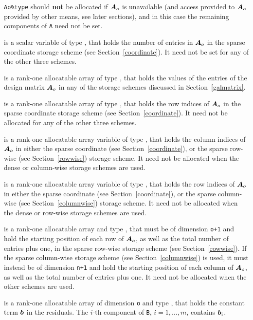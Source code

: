 \documentclass{galahad}
\begin{document}
\begin{description}
\begin{description}
\noindent
{\tt Ao\%type} should {\bf not} be allocated if ${\bm{A}}_o$ is unavailable
(and access provided to  ${\bm{A}}_o$ provided by other means, see later sections), 
and in this case the remaining components of {\tt A} need not be set.

 is a scalar variable of type \integer, that
holds the number of entries in ${\bm{A}}_o$
in the sparse coordinate storage scheme (see Section~\ref{coordinate}).
It need not be set for any of the other three schemes.

 is a rank-one allocatable array of type \realdp, that 
holds the values of the entries of the design matrix ${\bm{A}}_o$ in any of the
storage schemes discussed in Section~\ref{galmatrix}.

 is a rank-one allocatable array of type \integer,
that holds the row indices of ${\bm{A}}_o$ in the sparse coordinate storage
scheme (see Section~\ref{coordinate}).
It need not be allocated for any of the other three schemes.

 is a rank-one allocatable array variable of type \integer,
that holds the column indices of ${\bm{A}}_o$ in either the sparse coordinate
(see Section~\ref{coordinate}), or the sparse row-wise
(see Section~\ref{rowwise}) storage scheme.
It need not be allocated when the dense or column-wise storage schemes are used.

 is a rank-one allocatable array variable of type \integer,
that holds the row indices of ${\bm{A}}_o$ in either the sparse coordinate
(see Section~\ref{coordinate}), or the sparse column-wise
(see Section~\ref{columnwise}) storage scheme.
It need not be allocated when the dense or row-wise storage schemes are used.

 is a rank-one allocatable array and type \integer,
that must be of dimension {\tt o+1}
and hold the starting position of each row of ${\bm{A}}_o$, as well
as the total number of entries plus one, in the sparse row-wise storage
scheme (see Section~\ref{rowwise}).
If the sparse column-wise storage scheme (see Section~\ref{columnwise})
is used, it must instead be of dimension {\tt n+1}
and hold the starting position of each column of ${\bm{A}}_o$, as well
as the total number of entries plus one.
It need not be allocated when the
other schemes are used.

\end{description}

 is a rank-one allocatable array of dimension {\tt o} and type
\realdp, that holds the constant term ${\bm{b}}$ in the residuals.
The $i$-th component of {\tt B}, $i = 1, \ldots, m$, contains ${\bm{b}}_{i}$.


\end{description}
\end{document}
